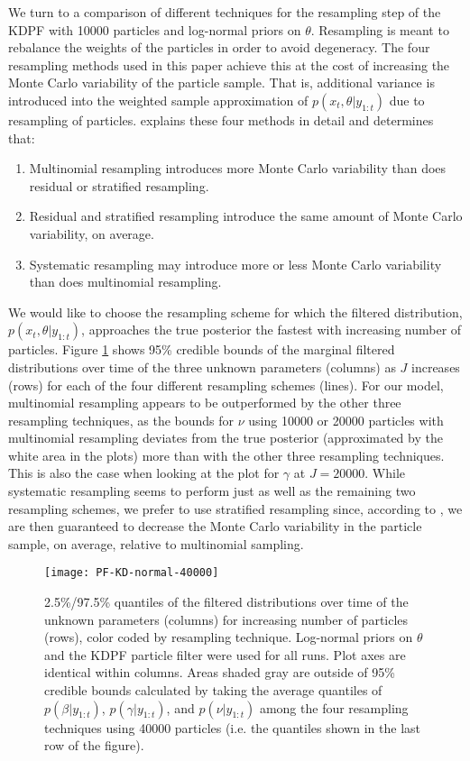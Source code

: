 \documentclass{elsarticle}
\begin{document}
We turn to a comparison of different techniques for the resampling step of the KDPF with 10000 particles and log-normal priors on $\theta$.  Resampling is meant to rebalance the weights of the particles in order to avoid degeneracy. The four resampling methods used in this paper achieve this at the cost of increasing the Monte Carlo variability of the particle sample. That is, additional variance is introduced into the weighted sample approximation of $p(x_t,\theta|y_{1:t})$ due to resampling of particles. \citet{Douc:Capp:Moul:comp:2005} explains these four methods in detail and determines that:

\begin{enumerate}
\item Multinomial resampling introduces more Monte Carlo variability than does residual or stratified resampling.
\item Residual and stratified resampling introduce the same amount of Monte Carlo variability, on average.
\item Systematic resampling may introduce more or less Monte Carlo variability than does multinomial resampling.
\end{enumerate}

We would like to choose the resampling scheme for which the filtered distribution, $p(x_t,\theta|y_{1:t})$, approaches the true posterior the fastest with increasing number of particles. Figure \ref{fig:resamp} shows 95\% credible bounds of the marginal filtered distributions over time of the three unknown parameters (columns) as $J$ increases (rows) for each of the four different resampling schemes (lines). For our model, multinomial resampling appears to be outperformed by the other three resampling techniques, as the bounds for $\nu$ using 10000 or 20000 particles with multinomial resampling deviates from the true posterior (approximated by the white area in the plots) more than with the other three resampling techniques. This is also the case when looking at the plot for $\gamma$ at $J = 20000$. While systematic resampling seems to perform just as well as the remaining two resampling schemes, we prefer to use stratified resampling since, according to \cite{Douc:Capp:Moul:comp:2005}, we are then guaranteed to decrease the Monte Carlo variability in the particle sample, on average, relative to multinomial sampling.

\begin{figure}
\centering
\texttt{[image: PF-KD-normal-40000]}
\caption{2.5\%/97.5\% quantiles of the filtered distributions over time of the unknown parameters (columns) for increasing number of particles (rows), color coded by resampling technique. Log-normal priors on $\theta$ and the KDPF particle filter were used for all runs.  Plot axes are identical within columns. Areas shaded gray are outside of 95\% credible bounds calculated by taking the average quantiles of $p(\beta|y_{1:t})$, $p(\gamma|y_{1:t})$, and $p(\nu|y_{1:t})$ among the four resampling techniques using 40000 particles (i.e. the quantiles shown in the last row of the figure).} \label{fig:resamp}
\end{figure}
\end{document}

